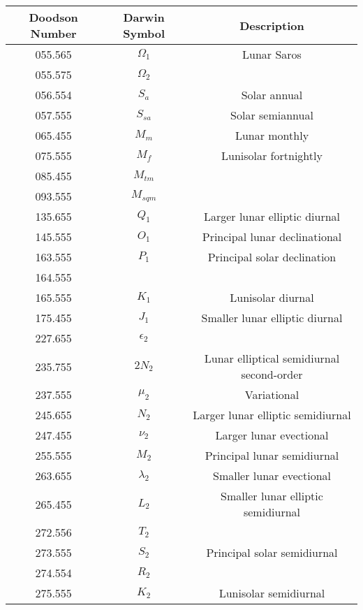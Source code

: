 \begin{table}[]
  \centering
  \begin{tabular}{ccc}
      \hline
      \textbf{Doodson Number} & \textbf{Darwin Symbol} & \textbf{Description} \\
      \hline
      055.565 & $\Omega _1$ & Lunar Saros \\
      055.575 & $\Omega _2$ & \\
      056.554 & $S_a$ & Solar annual \\
      057.555 & $S_{sa}$ & Solar semiannual \\
      065.455 & $M_m$ & Lunar monthly \\
      075.555 & $M_f$ & Lunisolar fortnightly \\
      085.455 & $M_{tm}$ & \\
      093.555 & $M_{sqm}$ & \\
      135.655 & $Q_1$ & Larger lunar elliptic diurnal \\
      145.555 & $O_1$ & Principal lunar declinational \\
      163.555 & $P_1$ & Principal solar declination \\
      164.555 & & \\
      165.555 & $K_1$ & Lunisolar diurnal \\
      175.455 & $J_1$ & Smaller lunar elliptic diurnal \\
      227.655 & $\epsilon _2$ & \\
      235.755 & $2N_2$ & Lunar elliptical semidiurnal second-order \\
      237.555 & $\mu _2$ & Variational \\
      245.655 & $N_2$ & Larger lunar elliptic semidiurnal \\
      247.455 & $\nu _2$ & Larger lunar evectional \\
      255.555 & $M_2$ & Principal lunar semidiurnal \\
      263.655 & $\lambda _2$ & Smaller lunar evectional \\
      265.455 & $L_2$ & Smaller lunar elliptic semidiurnal \\
      272.556 & $T_2$ & \\
      273.555 & $S_2$ & Principal solar semidiurnal \\
      274.554 & $R_2$ & \\
      275.555 & $K_2$ & Lunisolar semidiurnal \\

\end{tabular}
\end{table}
